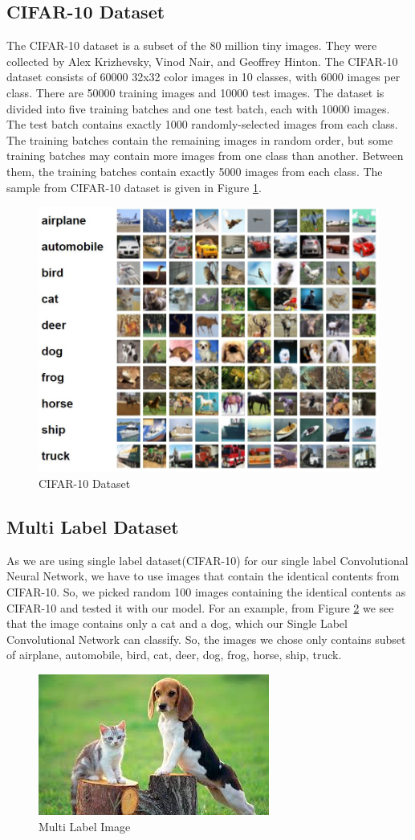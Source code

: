 \subsection{CIFAR-10 Dataset}
The CIFAR-10 dataset is a subset of the 80 million tiny images. They were collected by Alex Krizhevsky, Vinod Nair, and Geoffrey Hinton.
The CIFAR-10 dataset consists of 60000 32x32 color images in 10 classes, with 6000 images per class. There are 50000 training images and 10000 test images.
The dataset is divided into five training batches and one test batch, each with 10000 images. The test batch contains exactly 1000 randomly-selected images from each class. The training batches contain the remaining images in random order, but some training batches may contain more images from one class than another. Between them, the training batches contain exactly 5000 images from each class. The sample from CIFAR-10 dataset is given in Figure \ref{cifar10}.

\begin{figure}[h!]
  \centering
  \includegraphics[width=.4\textwidth]{images/cifar10.JPG}
  \caption{CIFAR-10 Dataset} \label{cifar10}
  \vspace{-.5cm}
\end{figure}

\subsection{Multi Label Dataset}
As we are using single label dataset(CIFAR-10) for our single label Convolutional Neural Network, we have to use images that contain the identical contents from CIFAR-10. So, we picked random 100 images containing the identical contents as CIFAR-10 and tested it with our model. For an example, from Figure \ref{multi} we see that the image contains only a cat and a  dog, which our Single Label Convolutional Network can classify. So, the images we chose only contains subset of airplane, automobile, bird, cat, deer, dog, frog, horse, ship, truck.  

\begin{figure}[h!]
  \centering
  \includegraphics[width=.3\textwidth]{images/multi.jpg}
  \caption{Multi Label Image} \label{multi}
  \vspace{-.5cm}
\end{figure}
